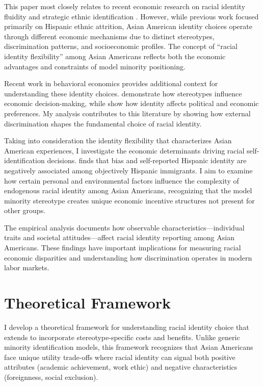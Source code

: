 This paper most closely relates to recent economic research on racial identity fluidity and strategic ethnic identification \autocite{hadah2024hispanicidentity, antmanEthnicAttritionObserved2016,antmanIncentivesIdentifyRacial2015,antmanAmericanIndianCasinos2021}. However, while previous work focused primarily on Hispanic ethnic attrition, Asian American identity choices operate through different economic mechanisms due to distinct stereotypes, discrimination patterns, and socioeconomic profiles. The concept of ``racial identity flexibility'' among Asian Americans reflects both the economic advantages and constraints of model minority positioning.

Recent work in behavioral economics provides additional context for understanding these identity choices. \textcite{bordaloStereotypes2016} demonstrate how stereotypes influence economic decision-making, while \textcite{bonomiIdentityBeliefsPolitical2021} show how identity affects political and economic preferences. My analysis contributes to this literature by showing how external discrimination shapes the fundamental choice of racial identity.

Taking into consideration the identity flexibility that characterizes Asian American experiences, I investigate the economic determinants driving racial self-identification decisions. \textcite{hadah2024hispanicidentity} finds that bias and self-reported Hispanic identity are negatively associated among objectively Hispanic immigrants. I aim to examine how certain personal and environmental factors influence the complexity of endogenous racial identity among Asian Americans, recognizing that the model minority stereotype creates unique economic incentive structures not present for other groups.

The empirical analysis documents how observable characteristics—individual traits and societal attitudes—affect racial identity reporting among Asian Americans. These findings have important implications for measuring racial economic disparities and understanding how discrimination operates in modern labor markets.

\section{Theoretical Framework}\label{sec:model}

I develop a theoretical framework for understanding racial identity choice that extends \textcite{akerlofEconomicsIdentity2000} to incorporate stereotype-specific costs and benefits. Unlike generic minority identification models, this framework recognizes that Asian Americans face unique utility trade-offs where racial identity can signal both positive attributes (academic achievement, work ethic) and negative characteristics (foreignness, social exclusion).

